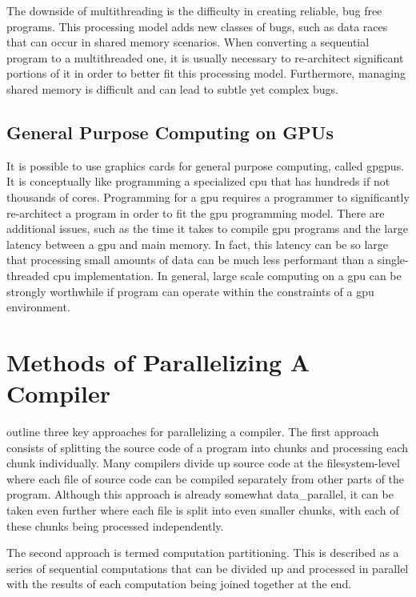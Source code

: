 The downside of multithreading is the difficulty in creating reliable, bug free
programs.  This processing model adds new classes of bugs, such as data races
that can occur in shared memory scenarios.  When converting a sequential program
to a multithreaded one, it is usually necessary to re-architect significant
portions of it in order to better fit this processing model. Furthermore,
managing shared memory is difficult and can lead to subtle yet complex bugs.

\subsection{General Purpose Computing on GPUs} \label{gpgpu}

It is possible to use graphics cards for general purpose computing, called
\glspl{gpgpu}. It is conceptually like programming a specialized \gls{cpu} that
has hundreds if not thousands of cores. Programming for a \gls{gpu} requires
a programmer to significantly re-architect a program in order to fit the
\gls{gpu} programming model. There are additional issues, such as the time it
takes to compile \gls{gpu} programs and the large latency between a \gls{gpu}
and main memory. In fact, this latency can be so large that processing small
amounts of data can be much less performant than a single-threaded \gls{cpu}
implementation. In general, large scale computing on a \gls{gpu} can be
strongly worthwhile if program can operate within the constraints of a \gls{gpu}
environment. 

\section{Methods of Parallelizing A Compiler} \label{compiler_parallel_methods}

\cite{gross_parallel_1989} outline three key approaches for parallelizing a
compiler. The first approach consists of splitting the source code of a program
into chunks and processing each chunk individually. Many compilers divide up
source code at the filesystem-level where each file of source code can be
compiled separately from other parts of the program. Although this approach is
already somewhat \gls{data_parallel}, it can be taken even further where each
file is split into even smaller chunks, with each of these chunks being
processed independently.

The second approach is termed computation partitioning. This is described as
a series of sequential computations that can be divided up and processed in
parallel with the results of each computation being joined together at the end.

